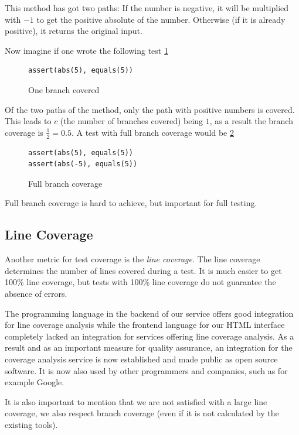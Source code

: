 This method has got two paths: If the number is negative, it will
be multiplied with $-1$ to get the positive absolute of the number.
Otherwise (if it is already positive), it returns the original input.

Now imagine if one wrote the following test \ref{code:oneBranch}

\begin{figure}
\begin{lstlisting}
assert(abs(5), equals(5))
\end{lstlisting}
\caption{One branch covered}
\label{code:oneBranch}
\end{figure}

Of the two paths of the method, only the path with positive numbers is
covered. This leads to $c$ (the number of branches covered) being $1$,
as a result the branch coverage is $\frac{1}{2} = 0.5$. A test with
full branch coverage would be \ref{code:fullBranch}

\begin{figure}
\begin{lstlisting}
assert(abs(5), equals(5))
assert(abs(-5), equals(5))
\end{lstlisting}
\caption{Full branch coverage}
\label{code:fullBranch}
\end{figure}

Full branch coverage is hard to achieve, but important for full testing.

\subsection{Line Coverage}

Another metric for test coverage is the \textit{line coverage}. The line
coverage determines the number of lines covered during a test. It is much
easier to get 100\% line coverage, but tests with 100\% line coverage do
not guarantee the absence of errors.

The programming language in the backend of our service offers good integration
for line coverage analysis while the frontend language for our HTML interface
completely lacked an integration for services offering line coverage analysis.
As a result and as an important measure for quality assurance, an integration
for the coverage analysis service is now established and made public as open
source software. It is now also used by other programmers and companies, such
as for example Google.

It is also important to mention that we are not satisfied with a large line
coverage, we also respect branch coverage (even if it is not calculated by
the existing tools).


